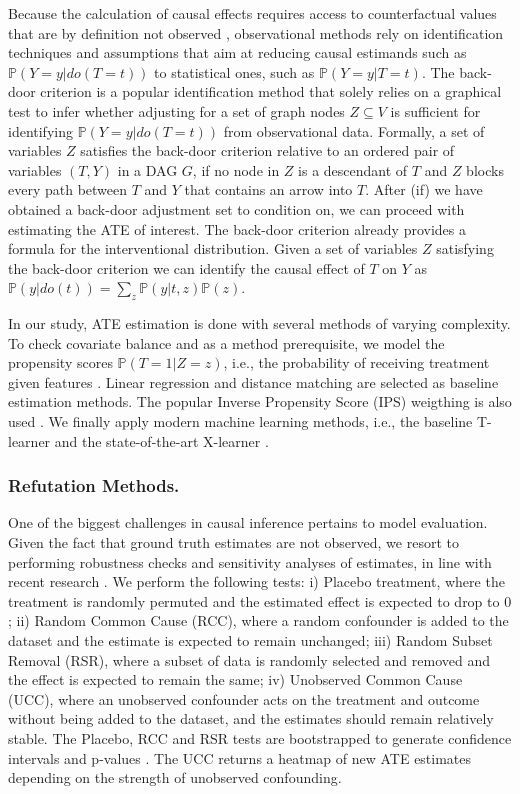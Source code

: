 \documentclass[letterpaper]{article} %
\begin{document}
Because the calculation of causal effects requires access to counterfactual values that are by definition not observed \cite{holland1986statistics}, observational methods rely on identification techniques and assumptions that aim at reducing causal estimands such as $\mathbb{P}(Y=y|do(T=t))$ to statistical ones, such as $\mathbb{P}(Y=y|T=t)$. The back-door criterion is a popular identification method that solely relies on a graphical test to infer whether adjusting for a set of graph nodes $Z\subseteq V$ is sufficient for identifying $\mathbb{P}(Y=y|do(T=t))$ from observational data. Formally, a set of variables $Z$ satisfies the back-door criterion relative to an ordered pair of variables $(T, Y)$ in a DAG $G$, if no node in $Z$ is a descendant of $T$ and $Z$ blocks every path between $T$ and $Y$ that contains an arrow into $T$.
After (if) we have obtained a back-door adjustment set to condition on, we can proceed with estimating the ATE of interest. The back-door criterion already provides a formula for the interventional distribution. Given a set of variables $Z$ satisfying the back-door criterion we can identify the causal effect of $T$ on $Y$ as $\mathbb{P}(y|do(t)) = \sum_z \mathbb{P}(y|t, z)\mathbb{P}(z)$.

In our study, ATE estimation is done with several methods of varying complexity. To check covariate balance and as a method prerequisite, we model the propensity scores $\mathbb{P}(T=1|Z=z)$, i.e., the probability of receiving treatment given features \cite{rosenbaum1983central}. Linear regression and distance matching are selected as baseline estimation methods. The popular Inverse Propensity Score (IPS) weigthing is also used \cite{stuart2010matching}. We finally apply modern machine learning methods, i.e., the baseline T-learner and the state-of-the-art X-learner \cite{kunzel_metalearners_2019}.

\subsubsection{Refutation Methods.}

One of the biggest challenges in causal inference pertains to model evaluation. Given the fact that ground truth estimates are not observed, we resort to performing robustness checks and sensitivity analyses of estimates, in line with recent research \cite{sharma2020dowhy, cinelli2020making}. We perform the following tests: i) Placebo treatment, where the treatment is randomly permuted and the estimated effect is expected to drop to $0$; ii) Random Common Cause (RCC), where a random confounder is added to the dataset and the estimate is expected to remain unchanged; iii) Random Subset Removal (RSR), where a subset of data is randomly selected and removed and the effect is expected to remain the same; iv) Unobserved Common Cause (UCC), where an unobserved confounder acts on the treatment and outcome without being added to the dataset, and the estimates should remain relatively stable. The Placebo, RCC and RSR tests are bootstrapped to generate confidence intervals and p-values \cite{diciccio1996bootstrap}. The UCC returns a heatmap of new ATE estimates depending on the strength of unobserved confounding.
\end{document}
